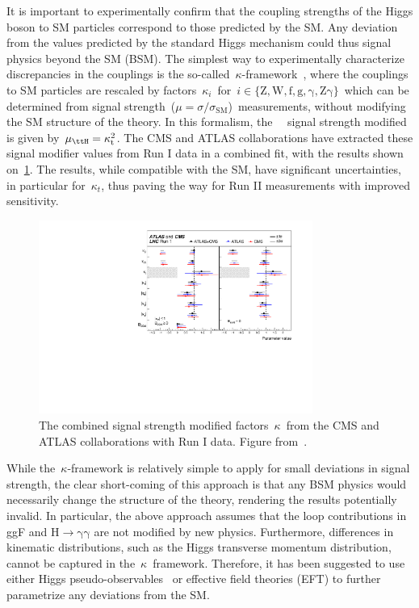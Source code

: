 It is important to experimentally confirm that the coupling strengths of the Higgs boson to SM particles correspond to those predicted by the SM. Any deviation from the values predicted by the standard Higgs mechanism could thus signal physics beyond the SM (BSM). The simplest way to experimentally characterize discrepancies in the couplings is the so-called~$\kappa$-framework~\cite{Heinemeyer:2013tqa}, where the couplings to SM particles are rescaled by factors~$\kappa_i$~for~$i \in \{\mathrm{Z}, \mathrm{W}, \mathrm{f}, \mathrm{g}, \mathrm{\gamma}, \mathrm{Z\gamma}\}$~which can be determined from signal strength~($\mu = \sigma / \sigma_{\mathrm{SM}}$)~measurements, without modifying the SM structure of the theory. In this formalism, the~\ttH~ signal strength modified is given by~$\mu_{\ttH} = \kappa_{\mathrm{t}}^2$. The CMS and ATLAS collaborations have extracted these signal modifier values from Run I data in a combined fit, with the results shown on~\cref{fig:higgs_kappa}. The results, while compatible with the SM, have significant uncertainties, in particular for~$\kappa_t$, thus paving the way for Run II measurements with improved sensitivity.

\begin{figure}
\begin{centering}
\includegraphics[width=0.8\textwidth]{figures/theory/CMS-HIG-15-002_Figure_015.pdf}
\caption[The Higgs signal strength modifier factors as measured by CMS and ATLAS]{The combined signal strength modified factors~$\kappa$~from the CMS and ATLAS collaborations with Run I data. Figure from~\cite{Khachatryan:2016vau}.}
\label{fig:higgs_kappa}
\end{centering}
\end{figure}

While the~$\kappa$-framework is relatively simple to apply for small deviations in signal strength, the clear short-coming of this approach is that any BSM physics would necessarily change the structure of the theory, rendering the results potentially invalid. In particular, the above approach assumes that the loop contributions in ggF and $\mathrm{H} \rightarrow \mathrm{\gamma} \mathrm{\gamma}$ are not modified by new physics. Furthermore, differences in kinematic distributions, such as the Higgs transverse momentum distribution, cannot be captured in the~$\kappa$~framework. Therefore, it has been suggested to use either Higgs pseudo-observables~\cite{Gonzalez-Alonso:2014eva} or effective field theories (EFT) to further parametrize any deviations from the SM.

